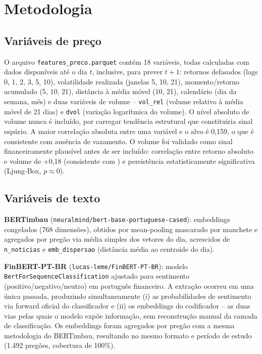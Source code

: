 \documentclass[conference]{IEEEtran}
\begin{document}
\section{Metodologia}

\subsection{Vari\'aveis de pre\c{c}o}
\label{sec:features-preco}

O arquivo \texttt{features\_preco.parquet} cont\'em 18 vari\'aveis, todas calculadas com dados dispon\'iveis at\'e o dia $t$, inclusive, para prever $t+1$: retornos defasados (lags 0, 1, 2, 3, 5, 10), volatilidade realizada (janelas 5, 10, 21), momento/retorno acumulado (5, 10, 21), dist\^ancia \`a m\'edia m\'ovel (10, 21), calend\'ario (dia da semana, m\^es) e duas vari\'aveis de volume -- \texttt{vol\_rel} (volume relativo \`a m\'edia m\'ovel de 21 dias) e \texttt{dvol} (varia\c{c}\~ao logar\'itmica do volume). O n\'ivel absoluto de volume nunca \'e inclu\'ido, por carregar tend\^encia estrutural que constituiria sinal esp\'urio. A maior correla\c{c}\~ao absoluta entre uma vari\'avel e o alvo \'e 0,159, o que \'e consistente com aus\^encia de vazamento. O volume foi validado como sinal financeiramente plaus\'ivel antes de ser inclu\'ido: correla\c{c}\~ao entre retorno absoluto e volume de +0,18 (consistente com \cite{karpoff1987}) e persist\^encia estatisticamente significativa (Ljung-Box, $p\approx0$).

\subsection{Vari\'aveis de texto}

\textbf{BERTimbau} (\texttt{neuralmind/bert-base-portuguese-cased}): embeddings congelados (768 dimens\~oes), obtidos por mean-pooling mascarado por manchete e agregados por preg\~ao via m\'edia simples dos vetores do dia, acrescidos de \texttt{n\_noticias} e \texttt{emb\_dispersao} (dist\^ancia m\'edia ao centroide do dia).

\textbf{FinBERT-PT-BR} (\texttt{lucas-leme/FinBERT-PT-BR}): modelo \texttt{BertForSequenceClassification} ajustado para sentimento (positivo/negativo/neutro) em portugu\^es financeiro. A extra\c{c}\~ao ocorreu em uma \'unica passada, produzindo simultaneamente (i) as probabilidades de sentimento via forward oficial do classificador e (ii) os embeddings do codificador -- as duas vias pelas quais o modelo exp\~oe informa\c{c}\~ao, sem reconstru\c{c}\~ao manual da camada de classifica\c{c}\~ao. Os embeddings foram agregados por preg\~ao com a mesma metodologia do BERTimbau, resultando no mesmo formato e per\'iodo de estudo (1.492 preg\~oes, cobertura de 100\%).
\end{document}

